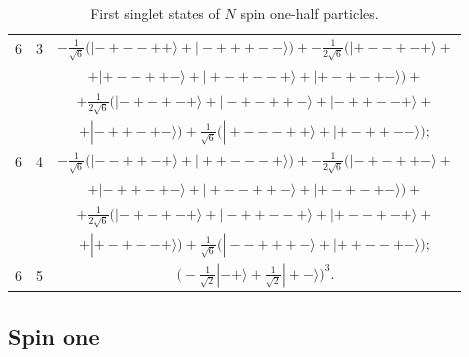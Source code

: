 \documentclass[rmp,amsfonts,showpacs,showkeys,preprint]{revtex4}
\begin{document}
\begin{table}
\begin{tabular}{ccc}
6&3&$ -\frac{1}{{\sqrt{6}}}\big(|-+--++\rangle
+|-+++--\rangle\big)+-\frac{1}{2
{\sqrt{6}}}\big(|+--+-+\rangle +$\\&&$+ |+--++-\rangle+
 |+-+--+\rangle +|+-+-+-\rangle\big)+$\\&&$ +\frac{1}{2 {\sqrt{6}}}\big(|-+-+-+\rangle +
 |-+-++-\rangle +|-++--+\rangle
 +$\\&&$+|-++-+-\rangle\big)+
 \frac{1}{{\sqrt{6}}}\big(|+ --- ++\rangle +|+-++--\rangle\big)
 ;$\\

6&4&$ -\frac{1}{{\sqrt{6}}}\big(|--++-+\rangle +
|++ --- +\rangle\big) +-\frac{1}{2
{\sqrt{6}}}\big(|-+-++-\rangle+$\\&&$ +|-++-+-\rangle +
|+--++-\rangle +|+-+-+-\rangle\big)+$\\&&$ +\frac{1}{2
{\sqrt{6}}}\big(|-+-+-+\rangle +
 |-++--+\rangle +|+--+-+\rangle+$\\&&$ +|+-+--+\rangle\big) +
 \frac{1}{{\sqrt{6}}}\big(|--+++-\rangle
 +|++--+-\rangle\big);$\\

6&5&$\big(-\frac{1}{{\sqrt{2}}}|-+\rangle
+\frac{1}{{\sqrt{2}}}|+-\rangle\big)^3.$\\\hline\hline
\end{tabular}
\caption{First singlet states of $N$ spin one-half particles.
\label{2005-singlet-t12}}
\end{table}




\subsection{Spin one}
\end{document}
